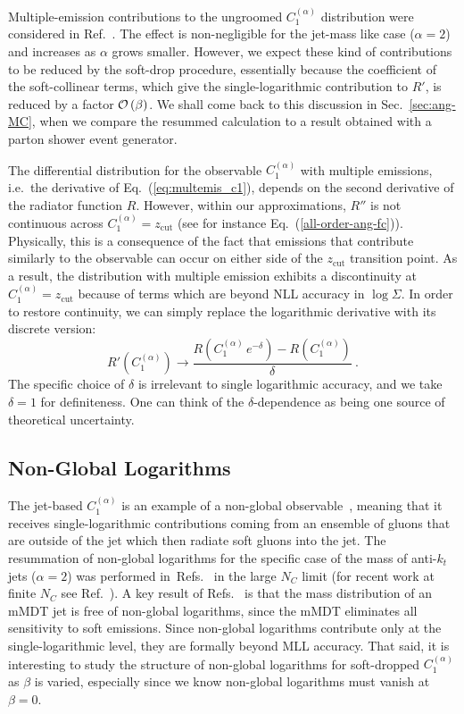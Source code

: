 \documentclass[letterpaper,11pt]{article}
\newcommand{\order}[1]{{\cal O}\left(#1\right)}
\newcommand{\C}[2]{C^{(#2)}_{#1}}
\newcommand{\zcut}{z_\text{cut}}
\newcommand{\ea}{{\C{1}{\alpha}}}
\DeclareRobustCommand{\Eq}[1]{Eq.~(\ref{#1})}
\DeclareRobustCommand{\Ref}[1]{Ref.~\cite{#1}}
\DeclareRobustCommand{\Refs}[1]{Refs.~\cite{#1}}
\DeclareRobustCommand{\order}[1]{{\cal O}(#1)}
\begin{document}
Multiple-emission contributions to the ungroomed $\ea$ distribution were considered in \Ref{Larkoski:2013eya}. The effect is non-negligible for the jet-mass like case ($\alpha=2$) and increases as $\alpha$ grows smaller. However, we expect these kind of contributions to be reduced by the soft-drop procedure, essentially because the coefficient of the soft-collinear terms, which give the single-logarithmic contribution to $R'$, is reduced by a factor $\order{\beta}$. We shall come back to this discussion in Sec.~\ref{sec:ang-MC}, when we compare the resummed calculation to a result obtained with a parton shower event generator.

The differential distribution for the observable $\ea$ with multiple emissions, i.e.\ the derivative of \Eq{eq:multemis_c1}, depends on the second derivative of the radiator function $R$. However, within our approximations, $R''$ is not continuous across $\ea=\zcut$ (see for instance \Eq{all-order-ang-fc}). Physically, this is a consequence of the fact that emissions that contribute similarly to the observable can occur on either side of the $\zcut$ transition point. As a result, the distribution with multiple emission exhibits a discontinuity at $\ea=\zcut$ because of terms which are beyond NLL accuracy in $\log \Sigma$.
In order to restore continuity, we can simply replace the logarithmic derivative with its discrete version:
\begin{equation} \label{finite-derivative}
R'(\ea) \to \frac{R(\ea \, e^{-\delta}) - R(\ea)}{\delta} \ .
\end{equation}
The specific choice of $\delta$ is irrelevant to single logarithmic accuracy, and we take $\delta = 1$ for definiteness.  One can think of the $\delta$-dependence as being one source of theoretical uncertainty.



\subsection{Non-Global Logarithms} \label{sec:ang-NGLs}

The jet-based $\ea$ is an example of a non-global observable~\cite{non-global}, meaning that it receives single-logarithmic contributions coming from an ensemble of gluons that are outside of the jet which then radiate soft gluons into the jet.
%
The resummation of non-global logarithms for the specific case of the mass of anti-$k_t$ jets ($\alpha=2$) was performed in~\Refs{BDKM, DKMS} in the large $N_C$ limit (for recent work at finite $N_C$ see \Ref{hatta}).  A key result of \Refs{taggersRES, taggersNLO} is that the mass distribution of an mMDT jet is free of non-global logarithms, since the mMDT eliminates all sensitivity to soft emissions.  Since non-global logarithms contribute only at the single-logarithmic level, they are formally beyond MLL accuracy.  That said, it is interesting to study the structure of non-global logarithms for soft-dropped $\ea$ as $\beta$ is varied, especially since we know non-global logarithms must vanish at $\beta = 0$.
\end{document}
